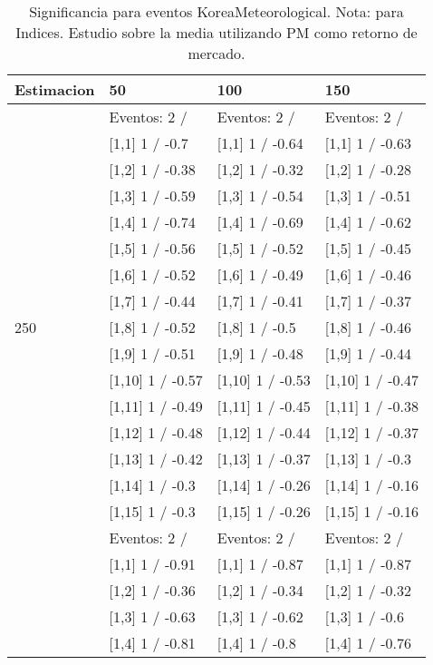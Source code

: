 \begin{table}

\caption{Significancia para eventos KoreaMeteorological. Nota: para Indices. Estudio sobre la media utilizando PM como retorno de mercado.}
\centering
\begin{tabular}[t]{llll}
\toprule
Estimacion & 50 & 100 & 150\\
\midrule
 & Eventos:  2 / & Eventos:  2 / & Eventos:  2 /\\
 & {}[1,1] 1  / -0.7 & {}[1,1] 1  / -0.64 & {}[1,1] 1  / -0.63\\
 & {}[1,2] 1  / -0.38 & {}[1,2] 1  / -0.32 & {}[1,2] 1  / -0.28\\
 & {}[1,3] 1  / -0.59 & {}[1,3] 1  / -0.54 & {}[1,3] 1  / -0.51\\
 & {}[1,4] 1  / -0.74 & {}[1,4] 1  / -0.69 & {}[1,4] 1  / -0.62\\
\addlinespace
 & {}[1,5] 1  / -0.56 & {}[1,5] 1  / -0.52 & {}[1,5] 1  / -0.45\\
 & {}[1,6] 1  / -0.52 & {}[1,6] 1  / -0.49 & {}[1,6] 1  / -0.46\\
 & {}[1,7] 1  / -0.44 & {}[1,7] 1  / -0.41 & {}[1,7] 1  / -0.37\\
250 & {}[1,8] 1  / -0.52 & {}[1,8] 1  / -0.5 & {}[1,8] 1  / -0.46\\
 & {}[1,9] 1  / -0.51 & {}[1,9] 1  / -0.48 & {}[1,9] 1  / -0.44\\
\addlinespace
 & {}[1,10] 1  / -0.57 & {}[1,10] 1  / -0.53 & {}[1,10] 1  / -0.47\\
 & {}[1,11] 1  / -0.49 & {}[1,11] 1  / -0.45 & {}[1,11] 1  / -0.38\\
 & {}[1,12] 1  / -0.48 & {}[1,12] 1  / -0.44 & {}[1,12] 1  / -0.37\\
 & {}[1,13] 1  / -0.42 & {}[1,13] 1  / -0.37 & {}[1,13] 1  / -0.3\\
 & {}[1,14] 1  / -0.3 & {}[1,14] 1  / -0.26 & {}[1,14] 1  / -0.16\\
\addlinespace
 & {}[1,15] 1  / -0.3 & {}[1,15] 1  / -0.26 & {}[1,15] 1  / -0.16\\
 & Eventos:  2 / & Eventos:  2 / & Eventos:  2 /\\
 & {}[1,1] 1  / -0.91 & {}[1,1] 1  / -0.87 & {}[1,1] 1  / -0.87\\
 & {}[1,2] 1  / -0.36 & {}[1,2] 1  / -0.34 & {}[1,2] 1  / -0.32\\
 & {}[1,3] 1  / -0.63 & {}[1,3] 1  / -0.62 & {}[1,3] 1  / -0.6\\
\addlinespace
 & {}[1,4] 1  / -0.81 & {}[1,4] 1  / -0.8 & {}[1,4] 1  / -0.76\\

\end{tabular}
\end{table}
